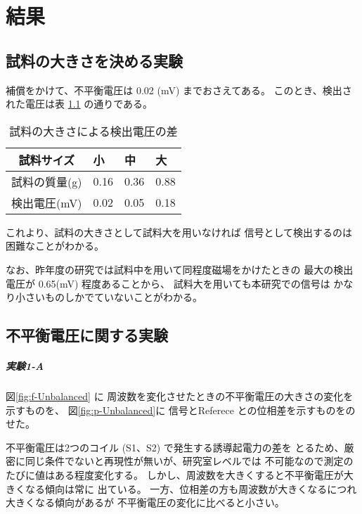 \chapter{結果}

\section{試料の大きさを決める実験}\label{sec:試料結果}

補償をかけて、不平衡電圧は 0.02 (mV) までおさえてある。
このとき、検出された電圧は表 \ref{table:試料} の通りである。

\begin{table}[htbp]
	\begin{center}
	\begin{tabular}{|c||l|l|l|}
	\hline
	試料サイズ & 小 & 中 & 大 \\
	\hline
	試料の質量(g) & 0.16 & 0.36 & 0.88 \\
	\hline
	検出電圧(mV) & 0.02 & 0.05 & 0.18 \\
	\hline
	\end{tabular}
	\end{center}
	\caption{試料の大きさによる検出電圧の差}
	\label{table:試料}
\end{table}

これより、試料の大きさとして試料大を用いなければ
信号として検出するのは困難なことがわかる。

なお、昨年度の研究では試料中を用いて同程度磁場をかけたときの
最大の検出電圧が 0.65(mV) 程度あることから、
試料大を用いても本研究での信号は
かなり小さいものしかでていないことがわかる。

\section{不平衡電圧に関する実験}\label{sec:不平衡電圧結果}

\paragraph{実験1-A}

図\ref{fig:f-Unbalanced} に
周波数を変化させたときの不平衡電圧の大きさの変化を示すものを、
図\ref{fig:p-Unbalanced}に
信号とReferece との位相差を示すものをのせた。

不平衡電圧は2つのコイル (S1、S2) で発生する誘導起電力の差を
とるため、厳密に同じ条件でないと再現性が無いが、研究室レベルでは
不可能なので測定のたびに値はある程度変化する。
しかし、周波数を大きくすると不平衡電圧が大きくなる傾向は常に
出ている。
一方、位相差の方も周波数が大きくなるにつれ大きくなる傾向があるが
不平衡電圧の変化に比べると小さい。


